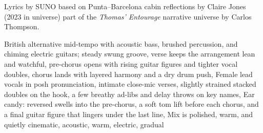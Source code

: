 
\begin{notes}
Lyrics by SUNO based on Punta--Barcelona cabin reflections by Claire Jones (2023 in universe) %
part of the \emph{Thomas’ Entourage} narrative universe by Carlos Thompson.
\end{notes}
\begin{style}
British alternative mid-tempo with acoustic bass, brushed percussion, and chiming electric guitars; steady swung groove, verse keeps the arrangement lean and watchful, pre-chorus opens with rising guitar figures and tighter vocal doubles, chorus lands with layered harmony and a dry drum push, Female lead vocals in posh pronunciation, intimate close-mic verses, slightly strained stacked doubles on the hook, a few breathy ad-libs and delay throws on key names, Ear candy: reversed swells into the pre-chorus, a soft tom lift before each chorus, and a final guitar figure that lingers under the last line, Mix is polished, warm, and quietly cinematic, acoustic, warm, electric, gradual
\end{style}
